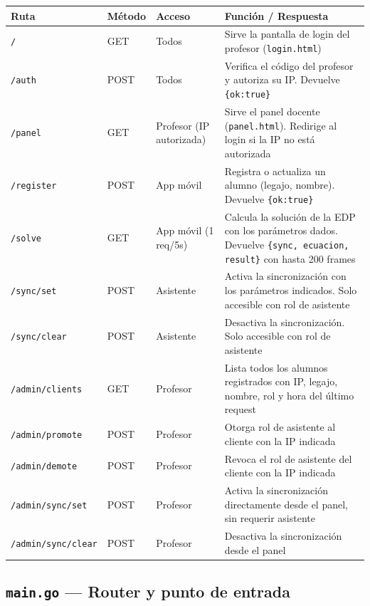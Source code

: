\documentclass[12pt, a4paper]{article}
\begin{document}
\begin{center}
\renewcommand{\arraystretch}{1.25}
\begin{tabular}{p{3.6cm} p{1.4cm} p{3.2cm} p{5.2cm}}
\toprule
\textbf{Ruta} & \textbf{Método} & \textbf{Acceso} & \textbf{Función / Respuesta} \\
\midrule
\texttt{/}
  & GET & Todos
  & Sirve la pantalla de login del profesor (\texttt{login.html}) \\
\texttt{/auth}
  & POST & Todos
  & Verifica el código del profesor y autoriza su IP. Devuelve \texttt{\{ok:true\}} \\
\texttt{/panel}
  & GET & Profesor (IP autorizada)
  & Sirve el panel docente (\texttt{panel.html}). Redirige al login si la IP no está autorizada \\
\texttt{/register}
  & POST & App móvil
  & Registra o actualiza un alumno (legajo, nombre). Devuelve \texttt{\{ok:true\}} \\
\texttt{/solve}
  & GET & App móvil (1 req/5s)
  & Calcula la solución de la EDP con los parámetros dados. Devuelve \texttt{\{sync, ecuacion, result\}} con hasta 200 frames \\
\texttt{/sync/set}
  & POST & Asistente
  & Activa la sincronización con los parámetros indicados. Solo accesible con rol de asistente \\
\texttt{/sync/clear}
  & POST & Asistente
  & Desactiva la sincronización. Solo accesible con rol de asistente \\
\midrule
\texttt{/admin/clients}
  & GET & Profesor
  & Lista todos los alumnos registrados con IP, legajo, nombre, rol y hora del último request \\
\texttt{/admin/promote}
  & POST & Profesor
  & Otorga rol de asistente al cliente con la IP indicada \\
\texttt{/admin/demote}
  & POST & Profesor
  & Revoca el rol de asistente del cliente con la IP indicada \\
\texttt{/admin/sync/set}
  & POST & Profesor
  & Activa la sincronización directamente desde el panel, sin requerir asistente \\
\texttt{/admin/sync/clear}
  & POST & Profesor
  & Desactiva la sincronización desde el panel \\
\bottomrule
\end{tabular}
\end{center}

\subsection{\texttt{main.go} — Router y punto de entrada}
\end{document}
